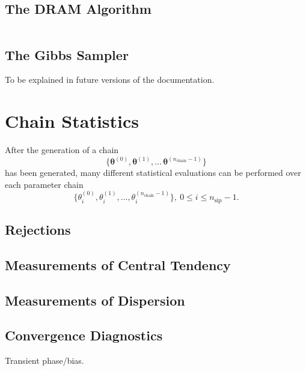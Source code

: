 \subsection{The DRAM Algorithm}%
$~$\\

\subsection{The Gibbs Sampler}

To be explained in future versions of the documentation.

\section{Chain Statistics}\label{sc-rmc-chain-stats}

After the generation of a chain
\begin{equation}\label{eq-markov-chain-2}
\{\boldsymbol{\theta}^{(0)},\boldsymbol{\theta}^{(1)},\ldots\,\boldsymbol{\theta}^{(n_{\text{chain}}-1)}\}
\end{equation}
has been generated, many different statistical evaluations can be performed over each parameter chain
\begin{equation}\label{eq-markov-chains-for-each-specific-parameter}
\{{\theta}_i^{(0)},{\theta}_i^{(1)},\ldots,{\theta}_i^{(n_{\text{chain}}-1)}\},~0\leqslant i\leqslant n_{\text{sip}}-1.
\end{equation}

\subsection{Rejections}

\subsection{Measurements of Central Tendency}

\subsection{Measurements of Dispersion}

\subsection{Convergence Diagnostics}

Transient phase/bias.

